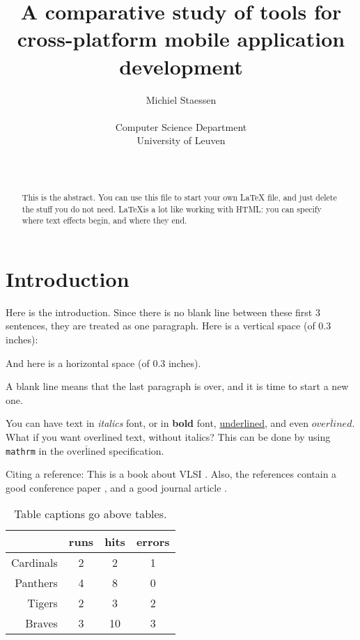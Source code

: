\documentclass[a4paper, conference]{IEEEconf}
\begin{document}
\title{A comparative study of tools for cross-platform mobile application development}
\author{Michiel Staessen \\
    \begin{affiliation}
       Computer Science Department\\
       University of Leuven\\
    \end{affiliation} \\
}
\maketitle

\begin{abstract}
    This is the abstract. You can use this file to start your own LaTeX file,
    and just delete the stuff you do not need. \LaTeX  is a lot like working
    with HTML: you can specify where text effects begin, and where they end.
\end{abstract}

\section{Introduction}\label{sec:intro}
Here is the introduction.
Since there is no blank line between these first 3 sentences, they are 
treated as one paragraph. 
Here is a vertical space (of 0.3 inches):
\vspace{.3in}

And here is a \hspace{.3in}horizontal space (of 0.3 inches).

A blank line means that the last paragraph is over, and it is time to start
a new one.

You can have text in {\it italics} font, or in {\bf bold} font,
\underline{underlined}, and even $\overline{overlined}$.
What if you want overlined text, without italics? This can
be done by using \verb"mathrm" in the 
$\overline{\mathrm{overlined}}$ specification.

Citing a reference: This is a book about VLSI \cite{Weste93}.
Also, the references contain a good conference paper \cite{LiY88},
and a good journal article \cite{BiS92}.


\begin{table}[!hbt]
\begin{center}
  \caption{Table captions go above tables.}
  \vspace{0.2in}
  \begin{tabular}{|r|c|c|c|}
     \hline
 & runs & hits & errors  \\
     \hline
Cardinals  & 2 & 2 & 1  \\
Panthers & 4 & 8 & 0  \\
Tigers  & 2 & 3 & 2  \\
Braves  & 3 & 10 & 3  \\
     \hline
  \end{tabular}
  \label{tab:example_tab}
\end{center}
\end{table}
\end{document}

